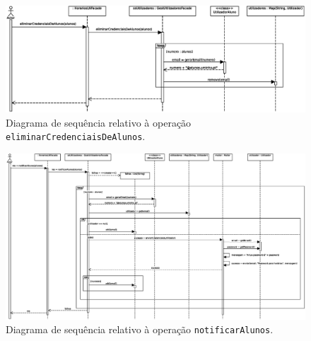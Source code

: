 \documentclass[12pt, a4paper]{article}
\begin{document}
\begin{landscape}
        \vspace*{\fill}
        \pagebreak
        \vspace*{\fill}

        \begin{figure}[H]
            \centering
            \includegraphics[scale=0.8]{Imagens/Modelos/eliminarCredenciaisDeAlunos.svg.eps}
            \caption{
                Diagrama de sequência relativo à operação \texttt{eliminarCredenciaisDeAlunos}.
            }
        \end{figure}

        \vspace*{\fill}
        \pagebreak
        \vspace*{\fill}

        \begin{figure}[H]
            \centering
            \includegraphics[scale=0.60]{Imagens/Modelos/notificarAlunos.svg.eps}
            \caption{
                Diagrama de sequência relativo à operação \texttt{notificarAlunos}.
            }
        \end{figure}

        \vspace*{\fill}
        \pagebreak
        \vspace*{\fill}


\end{landscape}
\end{document}
